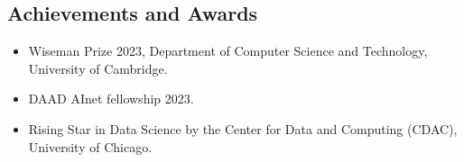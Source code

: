 \documentclass[margin, centered]{res}
\begin{document}
\begin{resume}
\section{Achievements and Awards}
\begin{itemize}[leftmargin=*]
 \item Wiseman Prize 2023, Department of Computer Science and Technology, University of Cambridge.
 \item DAAD AInet fellowship 2023.
 \item Rising Star in Data Science by the Center for Data and Computing (CDAC), University of Chicago.
\end{itemize}

\end{resume}
\end{document}
